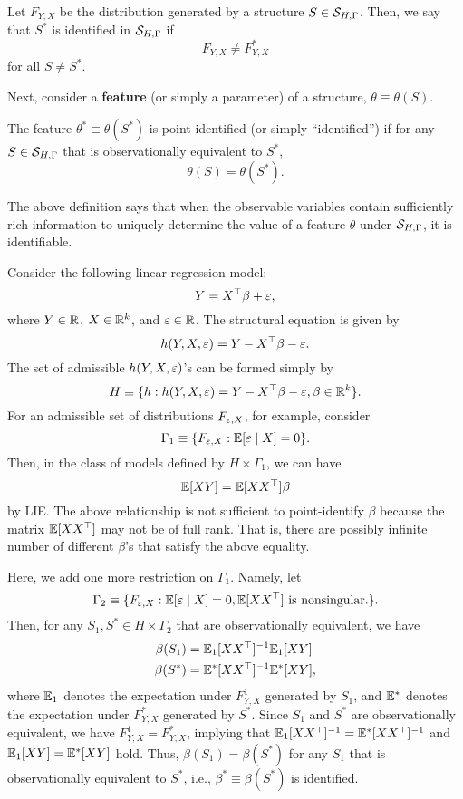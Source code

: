 \documentclass[11pt, A4paper, openany, uplatex]{book}
\begin{document}
\begin{definition}
	Let $F_{Y,X}$ be the distribution generated by a structure $S \in \mathcal{S}_{H,\Gamma}$.
	Then, we say that $S^*$ is identified in $\mathcal{S}_{H,\Gamma}$ if
	\[
	F_{Y,X} \neq F^*_{Y,X}
	\]
	for all $S \neq S^*$.
\end{definition} 

Next, consider a \textbf{feature} (or simply a parameter) of a structure, $\theta \equiv \theta(S)$.

\begin{definition} \label{def:identification}
	The feature $\theta^* \equiv \theta(S^*)$ is point-identified (or simply ``identified'') if for any $S \in \mathcal{S}_{H,\Gamma}$ that is observationally equivalent to $S^*$,
	\[
	\theta(S) = \theta(S^*).
	\]
\end{definition}
The above definition says that when the observable variables contain sufficiently rich information to uniquely determine the value of a feature $\theta$ under $\mathcal{S}_{H,\Gamma}$, it is identifiable.

\begin{example}\upshape
	Consider the following linear regression model:
	\[
		Y = X^\top \beta + \varepsilon,
	\]
	where $Y \in \mathbb{R}$, $X \in \mathbb{R}^k$, and $\varepsilon \in \mathbb{R}$.
	The structural equation is given by
	\[
	 	h(Y, X, \varepsilon) = Y - X^\top \beta - \varepsilon.
	\]
	The set of admissible $h(Y, X, \varepsilon)$'s can be formed simply by 
	\[
		H \equiv \{h : h(Y, X, \varepsilon) = Y -X^\top \beta-\varepsilon,  \beta \in \mathbb{R}^k\}.	
	\]
	For an admissible set of distributions $F_{\varepsilon,X}$, for example, consider 
	\[
		\Gamma_1 \equiv \{F_{\varepsilon,X} : \mathbb{E}[\varepsilon \mid X] = 0\}.
	\]
	Then, in the class of models defined by $H \times \Gamma_1$, we can have
	\[
	\mathbb{E} [XY ] = \mathbb{E}[XX^\top] \beta
	\]
	by LIE.
	The above relationship is not sufficient to point-identify $\beta$ because the matrix $\mathbb{E} [XX^\top]$ may not be of full rank.
	That is, there are possibly infinite number of different  $\beta$'s that satisfy the above equality.

	Here, we add one more restriction on $\Gamma_1$.
	Namely, let 
	\[
		\Gamma_2 \equiv \{F_{\varepsilon,X} : \mathbb{E}[\varepsilon \mid X] = 0, \mathbb{E}[XX^\top] \text{ is nonsingular.} \}.
	\]
	Then, for any $S_1, S^* \in H \times \Gamma_2$ that are observationally equivalent, we have
	\begin{align*}
	\beta(S_1) & = \mathbb{E}_1[XX^\top]^{-1} \mathbb{E}_1[XY ] \\
	\beta(S^*) & = \mathbb{E}^*[XX^\top]^{-1} \mathbb{E}^*[XY ],
	\end{align*}
	where $\mathbb{E}_1$ denotes the expectation under $F^1_{Y,X}$ generated by $S_1$, and $\mathbb{E}^*$ denotes the expectation under $F^*_{Y,X}$ generated by $S^*$.
	Since $S_1$ and $S^*$ are observationally equivalent, we have $F^1_{Y,X} = F^*_{Y,X}$, implying that $\mathbb{E}_1[XX^\top]^{-1} = \mathbb{E}^*[XX^\top]^{-1}$ and $\mathbb{E}_1[XY ] = \mathbb{E}^*[XY ]$ hold.
	Thus,  $\beta(S_1) =  \beta(S^*)$ for any $S_1$ that is observationally equivalent to $S^*$, i.e.,  $\beta^* \equiv \beta(S^*)$ is identified.
\end{example}
\end{document}
